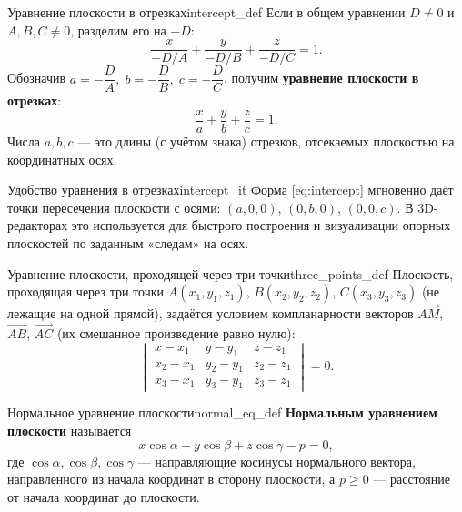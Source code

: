 \documentclass[12pt,a4paper]{article}
\begin{document}
\begin{definition}{Уравнение плоскости в отрезках}{intercept_def}
  Если в общем уравнении $D \neq 0$ и $A,B,C \neq 0$, разделим его на
  $-D$:
  \[
    \frac{x}{-D/A} + \frac{y}{-D/B} + \frac{z}{-D/C} = 1.
  \]
  Обозначив $a = -\dfrac{D}{A},\; b = -\dfrac{D}{B},\; c = -\dfrac{D}{C}$,
  получим \textbf{уравнение плоскости в отрезках}:
  \begin{equation}
    \frac{x}{a} + \frac{y}{b} + \frac{z}{c} = 1.
    \tag{10.3}\label{eq:intercept}
  \end{equation}
  Числа $a, b, c$ --- это длины (с учётом знака) отрезков, отсекаемых
  плоскостью на координатных осях.
\end{definition}

\begin{remarkIT}{Удобство уравнения в отрезках}{intercept_it}
  Форма \eqref{eq:intercept} мгновенно даёт точки пересечения плоскости
  с осями: $(a,0,0)$, $(0,b,0)$, $(0,0,c)$. В 3D-редакторах это
  используется для быстрого построения и визуализации опорных
  плоскостей по заданным «следам» на осях.
\end{remarkIT}

\begin{definition}{Уравнение плоскости, проходящей через три
  точки}{three_points_def}
  Плоскость, проходящая через три точки $A(x_1,y_1,z_1)$,
  $B(x_2,y_2,z_2)$, $C(x_3,y_3,z_3)$ (не лежащие на одной прямой),
  задаётся условием компланарности векторов
  $\overrightarrow{AM}$, $\overrightarrow{AB}$, $\overrightarrow{AC}$
  (их смешанное произведение равно нулю):
  \begin{equation}
    \begin{vmatrix}
      x - x_1 & y - y_1 & z - z_1 \\
      x_2 - x_1 & y_2 - y_1 & z_2 - z_1 \\
      x_3 - x_1 & y_3 - y_1 & z_3 - z_1
    \end{vmatrix} = 0.
    \tag{10.4}\label{eq:three_points}
  \end{equation}
\end{definition}

\begin{definition}{Нормальное уравнение плоскости}{normal_eq_def}
  \textbf{Нормальным уравнением плоскости} называется
  \begin{equation}
    x\cos\alpha + y\cos\beta + z\cos\gamma - p = 0,
    \tag{10.5}\label{eq:normal_form}
  \end{equation}
  где $\cos\alpha, \cos\beta, \cos\gamma$ --- направляющие косинусы
  нормального вектора, направленного из начала координат в сторону
  плоскости, а $p \ge 0$ --- расстояние от начала координат до
  плоскости.
\end{definition}
\end{document}

